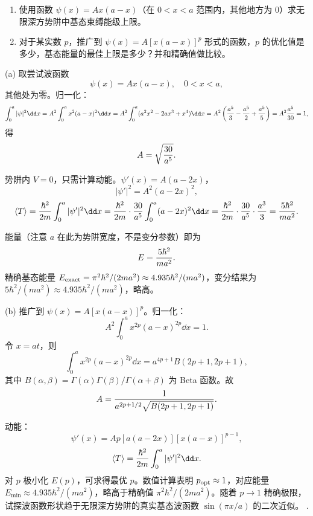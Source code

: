 \begin{question}
\begin{enumerate}
\item 使用函数 $\psi(x)=Ax(a-x)$（在 $0<x<a$ 范围内，其他地方为 0）求无限深方势阱中基态束缚能级上限。
\item 对于某实数 $p$，推广到 $\psi(x)=A[x(a-x)]^p$ 形式的函数，$p$ 的优化值是多少，基态能量的最佳上限是多少？并和精确值做比较。
\end{enumerate}
\end{question}
\begin{solution}
(a) 取尝试波函数
\[
\psi(x)=A x(a-x),\quad 0<x<a,
\]
其他处为零。归一化：
\[
\int_0^a|\psi|^2\dd x=A^2\int_0^a x^2(a-x)^2\dd x
=A^2\int_0^a (a^2x^2-2ax^3+x^4)\dd x
=A^2\left({a^5\over3}-{a^5\over2}+{a^5\over5}\right)
=A^2{a^5\over30}=1,
\]
得
\[
A=\sqrt{30\over a^5}.
\]

势阱内 $V=0$，只需计算动能。$\psi'(x)=A(a-2x)$，
\[
|\psi'|^2=A^2(a-2x)^2,
\]
\[
\langle T\rangle={\hbar^2\over2m}\int_0^a|\psi'|^2\dd x
={\hbar^2\over2m}\cdot{30\over a^5}\int_0^a (a-2x)^2\dd x
={\hbar^2\over2m}\cdot{30\over a^5}\cdot{a^3\over3}
={5\hbar^2\over ma^2}.
\]

能量（注意 $a$ 在此为势阱宽度，不是变分参数）即为
\[
E={5\hbar^2\over ma^2}.
\]
精确基态能量 $E_{\rm exact}=\pi^2\hbar^2/(2ma^2)\approx4.935\hbar^2/(ma^2)$，变分结果为 $5\hbar^2/(ma^2)\approx4.935\hbar^2/(ma^2)$，略高。

(b) 推广到 $\psi(x)=A[x(a-x)]^p$。归一化：
\[
A^2\int_0^a x^{2p}(a-x)^{2p}\dd x=1.
\]
令 $x=at$，则
\[
\int_0^a x^{2p}(a-x)^{2p}\dd x=a^{4p+1}B(2p+1,2p+1),
\]
其中 $B(\alpha,\beta)=\Gamma(\alpha)\Gamma(\beta)/\Gamma(\alpha+\beta)$ 为 Beta 函数。故
\[
A={1\over a^{2p+1/2}\sqrt{B(2p+1,2p+1)}}.
\]

动能：
\[
\psi'(x)=Ap[a(a-2x)][x(a-x)]^{p-1},
\]
\[
\langle T\rangle={\hbar^2\over2m}\int_0^a|\psi'|^2\dd x.
\]
对 $p$ 极小化 $E(p)$，可求得最优 $p$。数值计算表明 $p_{\rm opt}\approx1$，对应能量 $E_{\min}\approx4.935\hbar^2/(ma^2)$，略高于精确值 $\pi^2\hbar^2/(2ma^2)$。随着 $p\to1$ 精确极限，试探波函数形状趋于无限深方势阱的真实基态波函数 $\sin(\pi x/a)$ 的二次近似。
.
\end{solution}


